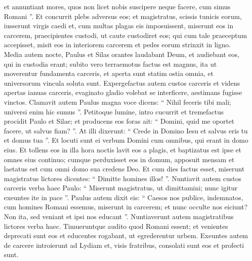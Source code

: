 \begin{biblechapter}
\begin{biblechapter}
\begin{biblechapter}
\begin{biblechapter}
\begin{biblechapter}
\begin{biblechapter}
\begin{biblechapter}
\begin{biblechapter}
\begin{biblechapter}
\begin{biblechapter}
\begin{biblechapter}
\begin{biblechapter}
\begin{biblechapter}
\begin{biblechapter}
\begin{biblechapter}
\begin{biblechapter}
\verse et annuntiant mores, quos non licet nobis suscipere neque facere, cum simus Romani ”. 
\verse Et concurrit plebs adversus eos; et magistratus, scissis tunicis eorum, iusserunt virgis caedi 
\verse et, cum multas plagas eis imposuissent, miserunt eos in carcerem, praecipientes custodi, ut caute custodiret eos; 
\verse qui cum tale praeceptum accepisset, misit eos in interiorem carcerem et pedes eorum strinxit in ligno.
 \verse Media autem nocte, Paulus et Silas orantes laudabant Deum, et audiebant eos, qui in custodia erant; 
\verse subito vero terraemotus factus est magnus, ita ut moverentur fundamenta carceris, et aperta sunt statim ostia omnia, et universorum vincula soluta sunt. 
\verse Expergefactus autem custos carceris et videns apertas ianuas carceris, evaginato gladio volebat se interficere, aestimans fugisse vinctos. 
\verse Clamavit autem Paulus magna voce dicens: “ Nihil feceris tibi mali; universi enim hic sumus ”. 
\verse Petitoque lumine, intro cucurrit et tremefactus procidit Paulo et Silae; 
\verse et producens eos foras ait: “ Domini, quid me oportet facere, ut salvus fiam? ”. 
\verse At illi dixerunt: “ Crede in Domino Iesu et salvus eris tu et domus tua ”. 
\verse Et locuti sunt ei verbum Domini cum omnibus, qui erant in domo eius. 
\verse Et tollens eos in illa hora noctis lavit eos a plagis, et baptizatus est ipse et omnes eius continuo; 
\verse cumque perduxisset eos in domum, apposuit mensam et laetatus est cum omni domo sua credens Deo.
 \verse Et cum dies factus esset, miserunt magistratus lictores dicentes: “ Dimitte homines illos! ”. 
\verse Nuntiavit autem custos carceris verba haec Paulo: “ Miserunt magistratus, ut dimittamini; nunc igitur exeuntes ite in pace ”. 
\verse Paulus autem dixit eis: “ Caesos nos publice, indemnatos, cum homines Romani essemus, miserunt in carcerem; et nunc occulte nos eiciunt? Non ita, sed veniant et ipsi nos educant ”. 
\verse Nuntiaverunt autem magistratibus lictores verba haec. Timueruntque audito quod Romani essent; 
\verse et venientes deprecati sunt eos et educentes rogabant, ut egrederentur urbem. 
\verse Exeuntes autem de carcere introierunt ad Lydiam et, visis fratribus, consolati sunt eos et profecti sunt.
 

\end{biblechapter}
\end{biblechapter}
\end{biblechapter}
\end{biblechapter}
\end{biblechapter}
\end{biblechapter}
\end{biblechapter}
\end{biblechapter}
\end{biblechapter}
\end{biblechapter}
\end{biblechapter}
\end{biblechapter}
\end{biblechapter}
\end{biblechapter}
\end{biblechapter}
\end{biblechapter}
